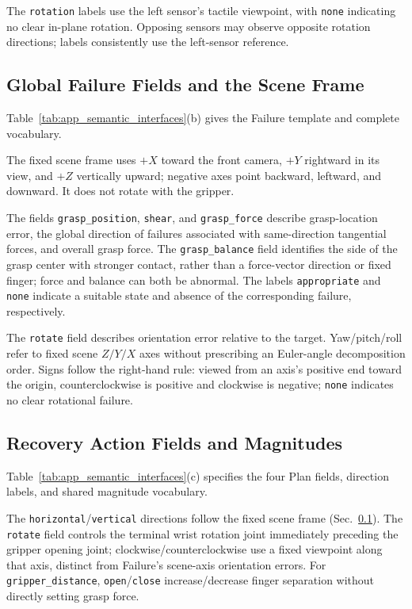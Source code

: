 The \texttt{rotation} labels use the left sensor's tactile viewpoint, with \texttt{none} indicating no clear in-plane rotation. Opposing sensors may observe opposite rotation directions; labels consistently use the left-sensor reference.

\subsection{Global Failure Fields and the Scene Frame}
\label{sec:app_failure}

Table~\ref{tab:app_semantic_interfaces}(b) gives the Failure template and complete vocabulary.

The fixed scene frame uses $+X$ toward the front camera, $+Y$ rightward in its view, and $+Z$ vertically upward; negative axes point backward, leftward, and downward. It does not rotate with the gripper.

The fields \texttt{grasp\_position}, \texttt{shear}, and \texttt{grasp\_force} describe grasp-location error, the global direction of failures associated with same-direction tangential forces, and overall grasp force. The \texttt{grasp\_balance} field identifies the side of the grasp center with stronger contact, rather than a force-vector direction or fixed finger; force and balance can both be abnormal. The labels \texttt{appropriate} and \texttt{none} indicate a suitable state and absence of the corresponding failure, respectively.

The \texttt{rotate} field describes orientation error relative to the target. Yaw/pitch/roll refer to fixed scene $Z/Y/X$ axes without prescribing an Euler-angle decomposition order. Signs follow the right-hand rule: viewed from an axis's positive end toward the origin, counterclockwise is positive and clockwise is negative; \texttt{none} indicates no clear rotational failure.

\subsection{Recovery Action Fields and Magnitudes}
\label{sec:app_plan}

Table~\ref{tab:app_semantic_interfaces}(c) specifies the four Plan fields, direction labels, and shared magnitude vocabulary.

The \texttt{horizontal}/\texttt{vertical} directions follow the fixed scene frame (Sec.~\ref{sec:app_failure}). The \texttt{rotate} field controls the terminal wrist rotation joint immediately preceding the gripper opening joint; clockwise/counterclockwise use a fixed viewpoint along that axis, distinct from Failure's scene-axis orientation errors. For \texttt{gripper\_distance}, \texttt{open}/\texttt{close} increase/decrease finger separation without directly setting grasp force.

